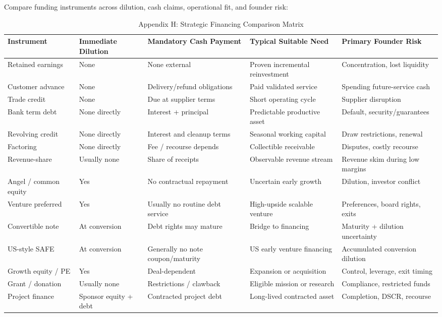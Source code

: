 Compare funding instruments across dilution, cash claims, operational fit, and founder risk:

\begin{table}[t]
\centering
\small
\caption{Appendix H: Strategic Financing Comparison Matrix}
\label{tab:app_h_financing_matrix}
\begin{tabularx}{\textwidth}{p{2.6cm} p{2.2cm} p{3.2cm} p{3.2cm} X}
\toprule
\textbf{Instrument} & \textbf{Immediate Dilution} & \textbf{Mandatory Cash Payment} & \textbf{Typical Suitable Need} & \textbf{Primary Founder Risk} \\
\midrule
Retained earnings & None & None external & Proven incremental reinvestment & Concentration, lost liquidity \\
Customer advance & None & Delivery/refund obligations & Paid validated service & Spending future-service cash \\
Trade credit & None & Due at supplier terms & Short operating cycle & Supplier disruption \\
Bank term debt & None directly & Interest + principal & Predictable productive asset & Default, security/guarantees \\
Revolving credit & None directly & Interest and cleanup terms & Seasonal working capital & Draw restrictions, renewal \\
Factoring & None directly & Fee / recourse depends & Collectible receivable & Disputes, costly recourse \\
Revenue-share & Usually none & Share of receipts & Observable revenue stream & Revenue skim during low margins \\
Angel / common equity & Yes & No contractual repayment & Uncertain early growth & Dilution, investor conflict \\
Venture preferred & Yes & Usually no routine debt service & High-upside scalable venture & Preferences, board rights, exits \\
Convertible note & At conversion & Debt rights may mature & Bridge to financing & Maturity + dilution uncertainty \\
US-style SAFE & At conversion & Generally no note coupon/maturity & US early venture financing & Accumulated conversion dilution \\
Growth equity / PE & Yes & Deal-dependent & Expansion or acquisition & Control, leverage, exit timing \\
Grant / donation & Usually none & Restrictions / clawback & Eligible mission or research & Compliance, restricted funds \\
Project finance & Sponsor equity + debt & Contracted project debt & Long-lived contracted asset & Completion, DSCR, recourse \\
\bottomrule
\end{tabularx}
\end{table}

